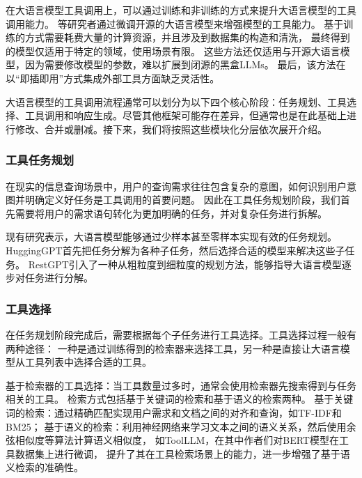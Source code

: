 在大语言模型工具调用上，可以通过训练和非训练的方式来提升大语言模型的工具调用能力。
\cite{Qin2023, schick2024toolformer, hao2024toolkengpt, parisi2022talm}等研究者通过微调开源的大语言模型来增强模型的工具能力。
基于训练的方式需要耗费大量的计算资源，并且涉及到数据集的构造和清洗，
最终得到的模型仅适用于特定的领域，使用场景有限。
这些方法还仅适用与开源大语言模型，因为需要修改模型的参数，难以扩展到闭源的黑盒LLMs。
最后，该方法在以“即插即用”方式集成外部工具方面缺乏灵活性。




大语言模型的工具调用流程通常可以划分为以下四个核心阶段\cite{Ruan2023, Shen2023, Song2023}：任务规划、工具选择、工具调用和响应生成。尽管其他框架可能存在差异，但通常也是在此基础上进行修改、合并或删减。接下来，我们将按照这些模块化分层依次展开介绍。

\subsubsection{工具任务规划}

在现实的信息查询场景中，用户的查询需求往往包含复杂的意图，如何识别用户意图并明确定义好任务是工具调用的首要问题。
因此在工具任务规划阶段，我们首先需要将用户的需求语句转化为更加明确的任务，并对复杂任务进行拆解。

现有研究\cite{Miao2023}表示，大语言模型能够通过少样本甚至零样本实现有效的任务规划。
HuggingGPT\cite{Shen2023}首先把任务分解为各种子任务，然后选择合适的模型来解决这些子任务。
RestGPT\cite{Song2023}引入了一种从粗粒度到细粒度的规划方法，能够指导大语言模型逐步对任务进行分解。

\subsubsection{工具选择}

在任务规划阶段完成后，需要根据每个子任务进行工具选择。工具选择过程一般有两种途径：
一种是通过训练得到的检索器来选择工具，另一种是直接让大语言模型从工具列表中选择合适的工具。

基于检索器的工具选择：当工具数量过多时，通常会使用检索器先搜索得到与任务相关的工具。
检索方式包括基于关键词的检索和基于语义的检索两种。
基于关键词的检索：通过精确匹配实现用户需求和文档之间的对齐和查询，如TF-IDF\cite{Jones1972}和BM25\cite{Robertson2009}；
基于语义的检索：利用神经网络来学习文本之间的语义关系，然后使用余弦相似度等算法计算语义相似度，
如ToolLLM\cite{Qin2023}，在其中作者们对BERT模型在工具数据集上进行微调，
提升了其在工具检索场景上的能力，进一步增强了基于语义检索的准确性。

